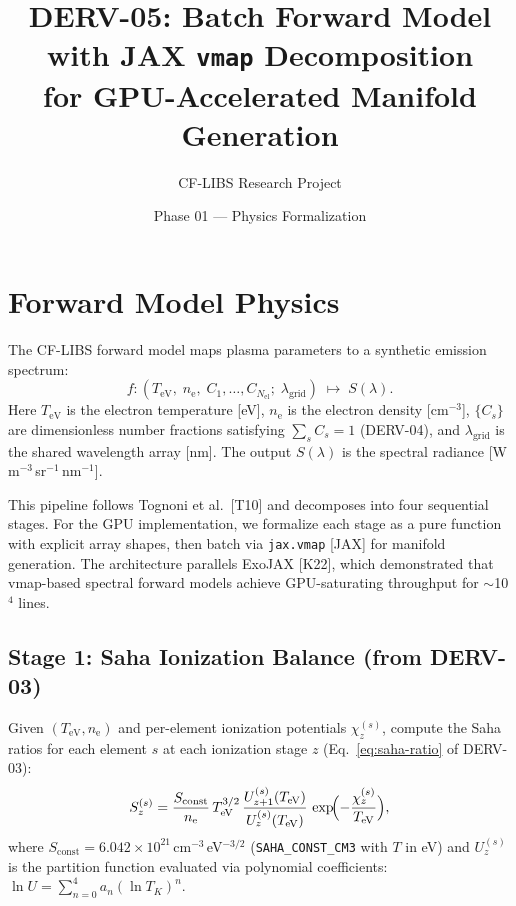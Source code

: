 \documentclass[11pt]{article}
\title{DERV-05: Batch Forward Model with JAX \texttt{vmap} Decomposition\\
       for GPU-Accelerated Manifold Generation}
\author{CF-LIBS Research Project}
\date{Phase 01 --- Physics Formalization}
\newcommand{\TeV}{T_\mathrm{eV}}
\newcommand{\ne}{n_\mathrm{e}}
\newcommand{\Sconst}{S_\mathrm{const}}
\begin{document}
\maketitle

\tableofcontents

\section{Forward Model Physics}
\label{sec:forward-model}

The CF-LIBS forward model maps plasma parameters to a synthetic emission spectrum:
\begin{equation}
  \label{eq:forward-map}
  f\colon (\TeV,\;\ne,\;C_1,\ldots,C_{N_\mathrm{el}};\;\lambda_\mathrm{grid})
  \;\longmapsto\; S(\lambda).
\end{equation}
Here $\TeV$ is the electron temperature [eV], $\ne$ is the electron density
[cm$^{-3}$], $\{C_s\}$ are dimensionless number fractions satisfying
$\sum_s C_s = 1$ (DERV-04), and $\lambda_\mathrm{grid}$ is the shared
wavelength array [nm]. The output $S(\lambda)$ is the spectral radiance
[W\,m$^{-3}$\,sr$^{-1}$\,nm$^{-1}$].

This pipeline follows Tognoni et al.\ [T10] and decomposes into four
sequential stages. For the GPU implementation, we formalize each stage
as a pure function with explicit array shapes, then batch via
\texttt{jax.vmap} [JAX] for manifold generation. The architecture
parallels ExoJAX [K22], which demonstrated that vmap-based spectral
forward models achieve GPU-saturating throughput for $\sim$10$^4$ lines.

\subsection{Stage 1: Saha Ionization Balance (from DERV-03)}
\label{sec:stage1}

Given $(\TeV, \ne)$ and per-element ionization potentials $\chi_z^{(s)}$,
compute the Saha ratios for each element $s$ at each ionization stage $z$
(Eq.~\eqref{eq:saha-ratio} of DERV-03):
\begin{equation}
  \label{eq:saha-ratio}
  S_z^{(s)} = \frac{\Sconst}{\ne}\,\TeV^{3/2}\,
    \frac{U_{z+1}^{(s)}(\TeV)}{U_z^{(s)}(\TeV)}\,
    \exp\!\Bigl(-\frac{\chi_z^{(s)}}{\TeV}\Bigr),
\end{equation}
where $\Sconst = 6.042\times10^{21}$\,cm$^{-3}$\,eV$^{-3/2}$
(\texttt{SAHA\_CONST\_CM3} with $T$ in eV) and $U_z^{(s)}$ is the
partition function evaluated via polynomial coefficients:
$\ln U = \sum_{n=0}^4 a_n (\ln T_K)^n$.
\end{document}

